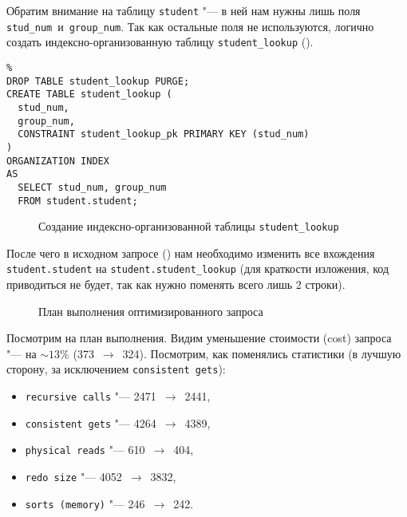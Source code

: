 Обратим внимание на таблицу \texttt{student} "--- в ней нам нужны лишь поля \texttt{stud\_num}~и~\texttt{group\_num}. Так как остальные поля не используются, логично создать индексно-организованную таблицу \texttt{student\_lookup} ().
\begin{samepage}%
  \begin{verbatim}%
DROP TABLE student_lookup PURGE;
CREATE TABLE student_lookup (
  stud_num,
  group_num,
  CONSTRAINT student_lookup_pk PRIMARY KEY (stud_num)
)
ORGANIZATION INDEX
AS
  SELECT stud_num, group_num
  FROM student.student;
  \end{verbatim}
  \begin{figure}[H]%
    \caption{Создание индексно-организованной таблицы \texttt{student\_lookup}}
    \label{laplus-daakunesu}
  \end{figure}
\end{samepage}

После чего в исходном запросе () нам необходимо изменить все вхождения \texttt{student.student} на \texttt{student.student\_lookup} (для краткости изложения, код приводиться не будет, так как нужно поменять всего лишь 2 строки).

\begin{figure}[H]%
  \caption{План выполнения оптимизированного запроса}
  \label{fig-task-3-iot-plan}
\end{figure}

Посмотрим на план выполнения. Видим уменьшение стоимости (cost) запроса "--- на $\sim 13$\% (373~$\to$~324).
Посмотрим, как поменялись статистики (в лучшую сторону, за исключением \texttt{consistent gets}):
\begin{itemize}%
  \item \texttt{recursive calls} "--- 2471~$\to$~2441,
  \item \texttt{consistent gets} "--- 4264~$\to$~4389,
  \item \texttt{physical reads} "--- 610~$\to$~404,
  \item \texttt{redo size} "--- 4052~$\to$~3832,
  \item \texttt{sorts (memory)} "--- 246~$\to$~242.
\end{itemize}
